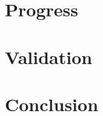 \documentclass{sig-alternate-05-2015}
\begin{document}
\section{Progress}
\label{sec:progress}


\section{Validation}
\label{sec:validation}


\section{Conclusion}
\label{sec:conclusion}

% 






\end{document}
